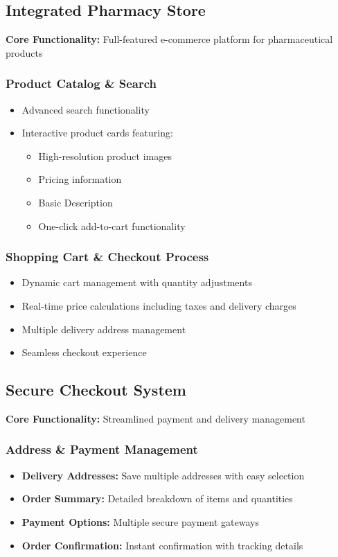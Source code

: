 \documentclass[12pt]{article}
\begin{document}
\subsection{Integrated Pharmacy Store}
\textbf{Core Functionality:} Full-featured e-commerce platform for pharmaceutical products

\subsubsection{Product Catalog \& Search}
\begin{itemize}[leftmargin=1cm]
    \item Advanced search functionality
    \item Interactive product cards featuring:
    \begin{itemize}
        \item High-resolution product images
        \item Pricing information
        \item Basic Description
        \item One-click add-to-cart functionality
    \end{itemize}
\end{itemize}

\subsubsection{Shopping Cart \& Checkout Process}
\begin{itemize}[leftmargin=1cm]
    \item Dynamic cart management with quantity adjustments
    \item Real-time price calculations including taxes and delivery charges
    \item Multiple delivery address management
    \item Seamless checkout experience
\end{itemize}

\subsection{Secure Checkout System}
\textbf{Core Functionality:} Streamlined payment and delivery management

\subsubsection{Address \& Payment Management}
\begin{itemize}[leftmargin=1cm]
    \item \textbf{Delivery Addresses:} Save multiple addresses with easy selection
    \item \textbf{Order Summary:} Detailed breakdown of items and quantities
    \item \textbf{Payment Options:} Multiple secure payment gateways
    \item \textbf{Order Confirmation:} Instant confirmation with tracking details
\end{itemize}
\end{document}
